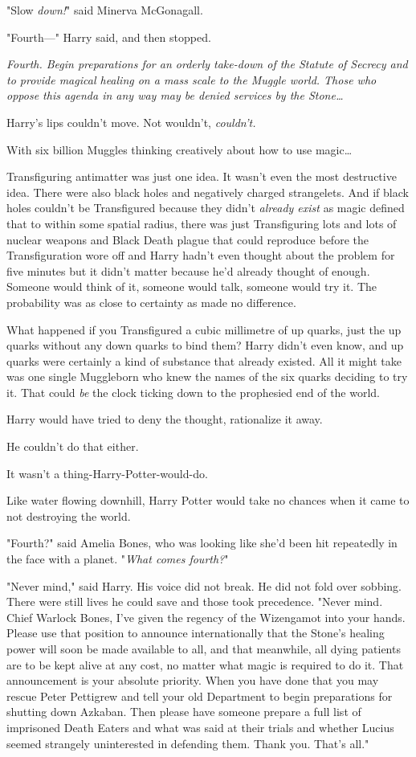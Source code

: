 "Slow \emph{down!}" said Minerva McGonagall.

"Fourth---" Harry said, and then stopped.

\emph{Fourth. Begin preparations for an orderly take-down of the Statute of
Secrecy and to provide magical healing on a mass scale to the Muggle world.
Those who oppose this agenda in any way may be denied services by the
Stone…}

Harry's lips couldn't move. Not wouldn't, \emph{couldn't.}

With six billion Muggles thinking creatively about how to use magic…

Transfiguring antimatter was just one idea. It wasn't even the most destructive
idea. There were also black holes and negatively charged strangelets. And if
black holes couldn't be Transfigured because they didn't \emph{already exist}
as magic defined that to within some spatial radius, there was just
Transfiguring lots and lots of nuclear weapons and Black Death plague that
could reproduce before the Transfiguration wore off and Harry hadn't even
thought about the problem for five minutes but it didn't matter because he'd
already thought of enough. Someone would think of it, someone would talk,
someone would try it. The probability was as close to certainty as made no
difference.

What happened if you Transfigured a cubic millimetre of up quarks, just the up
quarks without any down quarks to bind them? Harry didn't even know, and up
quarks were certainly a kind of substance that already existed. All it might
take was one single Muggleborn who knew the names of the six quarks deciding to
try it. That could \emph{be} the clock ticking down to the prophesied end of
the world.

Harry would have tried to deny the thought, rationalize it away.

He couldn't do that either.

It wasn't a thing-Harry-Potter-would-do.

Like water flowing downhill, Harry Potter would take no chances when it came to
not destroying the world.

"Fourth?" said Amelia Bones, who was looking like she'd been hit repeatedly in
the face with a planet. "\emph{What comes fourth?}"

"Never mind," said Harry. His voice did not break. He did not fold over
sobbing. There were still lives he could save and those took precedence. "Never
mind. Chief Warlock Bones, I've given the regency of the Wizengamot into your
hands. Please use that position to announce internationally that the Stone's
healing power will soon be made available to all, and that meanwhile, all dying
patients are to be kept alive at any cost, no matter what magic is required to
do it. That announcement is your absolute priority. When you have done that you
may rescue Peter Pettigrew and tell your old Department to begin preparations
for shutting down Azkaban. Then please have someone prepare a full list of
imprisoned Death Eaters and what was said at their trials and whether Lucius
seemed strangely uninterested in defending them. Thank you. That's all."


